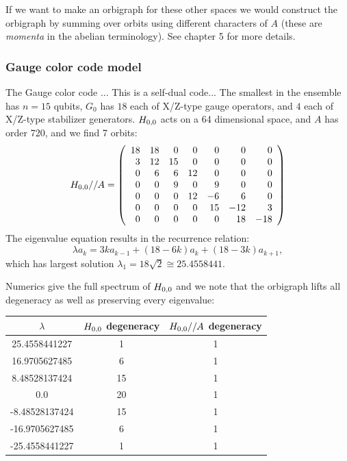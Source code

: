 If we want to make an orbigraph for these other spaces we would construct
the orbigraph by
summing over orbits using different characters of $A$
(these are \emph{momenta} in the abelian terminology).
See \cite{Cvetkovic1980} chapter 5 for more details.

%
\subsubsection{Gauge color code model}
The Gauge color code \cite{Bombin2015,Bombin2015single}...
This is a self-dual code...
The smallest in the ensemble has $n=15$ qubits,
$G_0$ has $18$ each of X/Z-type gauge operators,
and $4$ each of X/Z-type stabilizer generators.
$H_{0,0}$ acts on a 64 dimensional space, and $A$ has
order 720, and we find 7 orbits:
$$
H_{0,0}//A = 
\left(\begin{array}{rrrrrrr}
18 & 18 &  0 &  0 &  0 &  0 &  0 \cr
  3 & 12 & 15 &  0 &  0 &  0 &  0 \cr
  0 &  6 &  6 & 12 &  0 &  0 &  0 \cr
  0 &  0 &  9 &  0 &  9 &  0 &  0 \cr
  0 &  0 &  0 & 12 & -6 &  6 &  0 \cr
  0 &  0 &  0 &  0 & 15 & -12 &  3 \cr
  0 &  0 &  0 &  0 &  0 & 18 & -18
\end{array}\right)
$$
The eigenvalue equation results in
the recurrence relation:
$$
    \lambda a_k = 3ka_{k-1} + (18-6k)a_k + (18-3k)a_{k+1},
$$
which has largest solution 
$\lambda_1 = 18\sqrt{2} \cong 25.4558441.$


Numerics give the full spectrum of $H_{0,0}$ and we note that the orbigraph lifts
all degeneracy as well as preserving every eigenvalue:
\begin{center}
\begin{tabular}{ c|c|c } 
$\lambda$ & $H_{0,0}$ degeneracy & $H_{0,0}//A$ degeneracy \\
\hline
    25.4558441227 & 1 & 1 \\
    16.9705627485 & 6 & 1 \\
    8.48528137424 & 15 & 1 \\
    0.0 & 20 & 1 \\
    -8.48528137424 & 15 & 1 \\
    -16.9705627485 & 6 & 1 \\
    -25.4558441227 & 1 & 1 \\
\end{tabular}
\end{center}


